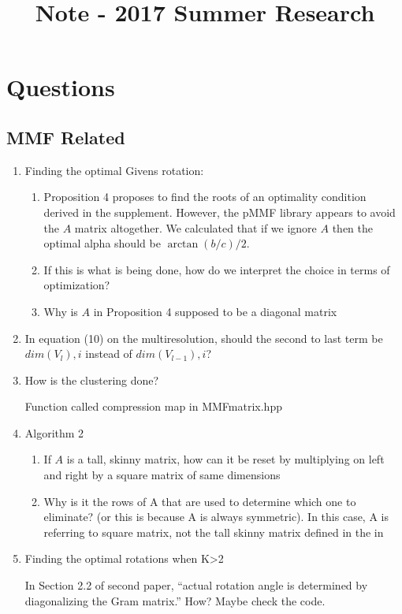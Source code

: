 \documentclass[a4paper]{article}
\title{Note - 2017 Summer Research}
\begin{document}
\maketitle

\tableofcontents

\newpage
\section{Questions}

\subsection{MMF Related}
\begin{enumerate}
\item Finding the optimal Givens rotation: 
\begin{enumerate}
\item Proposition 4 proposes to find the roots of an optimality condition derived in the supplement. However, the pMMF library appears to avoid the $A$ matrix altogether. We calculated that if we ignore $A$ then the optimal alpha should be $\arctan(b/c)/2$.
\item If this is what is being done, how do we interpret the choice in terms of optimization?
\item Why is $A$ in Proposition 4 supposed to be a diagonal matrix  
\end{enumerate}

\item In equation (10) on the multiresolution, should the second to last term be $dim(V_l),i$ instead of $dim(V_{l-1}),i$?
\item How is the clustering done?

Function called compression map in MMFmatrix.hpp
\item Algorithm 2
\begin{enumerate}

\item If $A$ is a tall, skinny matrix, how can it be reset by multiplying on left and right by a square matrix of same dimensions

\item Why is it the rows of A that are used to determine which one to eliminate? (or this is because A is always symmetric). In this case, A is referring to square matrix, not the tall skinny matrix defined in the in
\end{enumerate}

\item Finding the optimal rotations when K>2

In Section 2.2 of second paper, “actual rotation angle is determined by diagonalizing the Gram matrix.” How? Maybe check the code.
\end{enumerate}
\end{document}
